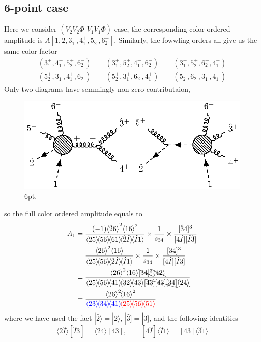 \documentclass[12pt]{article}
\newcommand{\mdavg}[2]{\langle #1 \rangle\!\langle #2 \rangle}
\newcommand{\avg}[1]{\langle #1 \rangle}
\newcommand{\inavg}[2]{\langle #1 \rangle\! [#2]}
\newcommand{\rinavg}[2]{[#1]\!\langle #2 \rangle}
\newcommand{\aket}[1]{|#1\rangle}
\newcommand{\asqu}[1]{{\langle#1\rangle}^2}
\newcommand{\sket}[1]{|#1]}
\begin{document}
\subsection{6-point case}
Here we consider $(V_2V_2\Phi^\dagger V_1V_1 \Phi)$ case, the corresponding color-ordered amplitude is $A[1,2,3_1^+,4_1^+,5_2^+,6_2^-]$.
Similarly, the fowwling orders all give us the same color factor
\begin{gather*}
    (3_1^+,4_1^+,5_2^+,6_2^-)\qquad(3_1^+,5_2^+,4_1^+,6_2^-)\qquad (3_1^+,5_2^+,6_2^-,4_1^+)\\
    (5_2^+,3_1^+,4_1^+,6_2^-)\qquad(5_2^+,3_1^+,6_2^-,4_1^+)\qquad (5_2^+,6_2^-,3_1^+,4_1^+)
\end{gather*}
Only two diagrams have semmingly non-zero contributaion,
\par
\begin{figure}[H]
    \centering
    \includegraphics{6pt.eps}
    \caption{6pt.}
    \label{5}
\end{figure}
so the full color ordered amplitude equals to
\begin{align*}
    A_1&=\frac{(-1)\asqu{\hat{2}6}\asqu{16}}{\mdavg{25}{56}\!\avg{61}\!\mdavg{\hat{2}\hat{I}}{\hat{I}1}}\times\frac{1}{s_{34}}\times\frac{[\hat{3}4]^3}{[4\hat{I}][\hat{I}\hat{3}]}\\
    &=\frac{\asqu{26}\avg{16}}{\mdavg{25}{56}\!\mdavg{\hat{2}\hat{I}}{\hat{I}1}}\times\frac{1}{s_{34}}\times\frac{[34]^3}{[4\hat{I}][\hat{I}3]}\\
    &=\frac{\asqu{26}\avg{16}\bcancel{[34]^3}\bcancel{\avg{42}}}{\mdavg{25}{56}\!\mdavg{41}{32}\!\avg{43}\bcancel{[43][43][34]}\bcancel{\avg{24}}}\\
    &=\frac{\asqu{26}\!\asqu{16}}{\textcolor{blue}{\mdavg{23}{34}\!\avg{41}}\!\textcolor{red}{\mdavg{25}{56}\!\avg{51}}}
\end{align*}
where we have used the fact $\aket{\hat{2}}=\aket{2}$, $\sket{\hat{3}}=\sket{3}$, and the following identities
\begin{equation*}
    \inavg{2\hat{I}}{\hat{I}3}=\inavg{24}{43}, \qquad \rinavg{4\hat{I}}{\hat{I}1}=\rinavg{43}{\hat{3}1}
\end{equation*}
\end{document}
